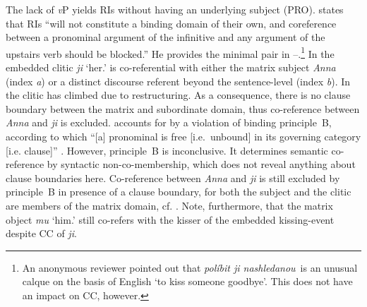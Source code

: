 \documentclass[output=paper,colorlinks,citecolor=brown]{langscibook}
\begin{document}
The lack of \textit{v}P yields RIs without having an underlying subject (PRO). \citet[114]{Rezac2005} states that RIs “will not constitute a binding domain of their own, and coreference between a pronominal argument of the infinitive and any argument of the upstairs verb should be blocked.” He provides the minimal pair in --.\footnote{An anonymous reviewer pointed out that \textit{políbit ji nashledanou} is an unusual calque on the basis of English ‘to kiss someone goodbye’. This does not have an impact on CC, however.} In  the embedded clitic \textit{ji} ‘her.{\ACC}’ is co-referential with either the matrix subject \textit{Anna} (index \textit{a}) or a distinct discourse referent beyond the sentence-level (index \textit{b}). In  the clitic has climbed due to restructuring. As a consequence, there is no clause boundary between the matrix and subordinate domain, thus co-reference between \textit{Anna} and \textit{ji} is excluded. \citet{Rezac2005} accounts for  by a violation of binding principle~B, according to which “[a] pronominal is free [i.e. unbound] in its governing category [i.e. clause]” \citep[188]{Chomsky1981}. However, principle~B is inconclusive. It determines semantic co-reference by syntactic non-co-membership, which does not reveal anything about clause boun\-daries here. Co-reference between \textit{Anna} and \textit{ji} is still excluded by principle~B in presence of a clause boundary, for both the subject and the clitic are members of the matrix domain, cf. . Note, furthermore, that the matrix object \textit{mu} ‘him.{\DAT}’ still co-refers with the kisser of the embedded kissing-event despite CC of \textit{ji}.


\ea\label{kul:ex:anna-mu}
\z
\z
\end{document}
